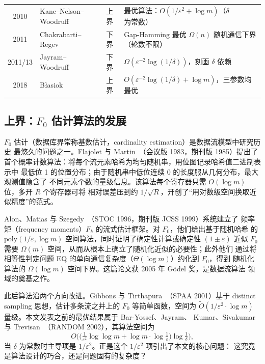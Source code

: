 \documentclass[UTF8, 11pt, a4paper, linestretch=1.15]{ctexart}
\theoremstyle{zhstyle}
\newcommand{\eps}{\varepsilon}
\newcommand{\Fzero}{F_0}
\begin{document}
\begin{table}[htbp]
\begin{tabularx}{\textwidth}{@{}c l l >{\raggedright\arraybackslash}X@{}}
			2010 & Kane--Nelson--Woodruff~\cite{KNW10} & 上界 &
			最优算法：$O(1/\eps^2 + \log m)$（$\delta$ 为常数） \\
			2011 & Chakrabarti--Regev~\cite{CR11} & 下界 &
			Gap-Hamming 最优 $\Omega(n)$ 随机通信下界（轮数不限） \\
			2011/13 & Jayram--Woodruff~\cite{JW13} & 下界 &
			$\Omega(\eps^{-2}\log(1/\delta))$，刻画 $\delta$ 依赖 \\
			2018 & Błasiok~\cite{Bla18} & 上界 &
			$O(\eps^{-2}\log(1/\delta) + \log m)$，三参数均最优 \\
			\bottomrule
		\end{tabularx}
	\end{table}
	
	\subsection{上界：$\Fzero$ 估计算法的发展}
	
	$\Fzero$ 估计（数据库界常称基数估计，cardinality estimation）是数据流模型中研究历史
	最悠久的问题之一。Flajolet 与 Martin~\cite{FM85}（会议版 1983，期刊版 1985）提出了
	首个概率计数算法：将每个流元素哈希为均匀随机串，用位图记录哈希值二进制表示中
	最低位 1 的位置分布；由于随机串中低位连续 0 的长度服从几何分布，最大观测值隐含了
	不同元素个数的量级信息。该算法每个寄存器只需 $O(\log m)$ 位，多开 $R$ 个寄存器可将
	相对误差压到约 $1/\sqrt{R}$，开创了“用对数级空间换取近似精度”的范式。
	
	Alon、Matias 与 Szegedy~\cite{AMS99}（STOC 1996，期刊版 JCSS 1999）系统建立了
	频率矩（frequency moments）$F_k$ 的流式估计框架。对 $\Fzero$，他们给出基于随机哈希
	的 $\mathrm{poly}(1/\eps, \log m)$ 空间算法，同时证明了确定性计算或确定性 $(1\pm\eps)$
	近似 $\Fzero$ 需要 $\Omega(m)$ 空间，从而从根本上确立了随机化近似的必要性；此外他们
	通过将相等性判定问题 EQ 的单向通信复杂度（$\Theta(\log m)$）约化到 $\Fzero$，得到
	随机化算法的 $\Omega(\log m)$ 空间下界。这篇论文获 2005 年 Gödel 奖，是数据流算法
	领域的奠基之作。
	
	此后算法沿两个方向改进。Gibbons 与 Tirthapura~\cite{GT01}（SPAA 2001）基于
	distinct sampling 思想，估计多条流之并上的 $\Fzero$ 等简单函数，空间为
	$\tilde{O}(1/\eps^2 \cdot \log m)$ 量级。本文发表之前的最优结果属于 Bar-Yossef、Jayram、
	Kumar、Sivakumar 与 Trevisan~\cite{BJKST02}（RANDOM 2002），其算法空间为
	\[
	O\Big(\big(\tfrac{1}{\eps^2}\log\log m + \log m \cdot \log\tfrac{1}{\eps}\big)
	\log\tfrac{1}{\delta}\Big),
	\]
	当 $\delta$ 为常数时主导项是 $1/\eps^2$。正是这个 $1/\eps^2$ 项引出了本文的核心问题：
	这究竟是算法设计的巧合，还是问题固有的复杂度？
	
\end{document}
